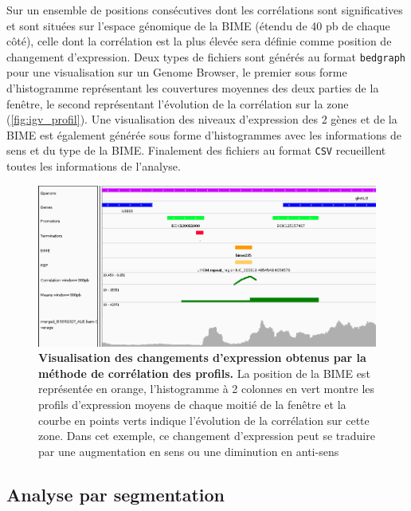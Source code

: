 \documentclass[12pt,a4paper]{report}
\begin{document}
\begin{onehalfspace}
Sur un ensemble de positions consécutives dont les corrélations sont significatives et sont situées sur l'espace génomique de la BIME (étendu de 40 pb de chaque côté), celle dont la corrélation est la plus élevée sera définie comme position de changement d'expression. Deux types de fichiers sont générés au format \texttt{bedgraph} pour une visualisation sur un Genome Browser, le premier sous forme d'histogramme représentant les couvertures moyennes des deux parties de la fenêtre, le second représentant l'évolution de la corrélation sur la zone (\autoref{fig:igv_profil}). Une visualisation des niveaux d'expression des 2 gènes et de la BIME est également générée sous forme d'histogrammes avec les informations de sens et du type de la BIME. Finalement des fichiers au format \texttt{CSV} recueillent toutes les informations de l'analyse.

\begin{figure}[ht]
\centerline{\includegraphics[scale=0.246]{figures/igv_profil.png}}
\caption{\textbf{Visualisation des changements d'expression obtenus par la méthode de corrélation des profils.} La position de la BIME est représentée en orange, l'histogramme à 2 colonnes en vert montre les profils d'expression moyens de chaque moitié de la fenêtre et la courbe en points verts indique l'évolution de la corrélation sur cette zone. Dans cet exemple, ce changement d'expression peut se traduire par une augmentation en sens ou une diminution en anti-sens}
\label{fig:igv_profil} 
\end{figure}

\subsection*{Analyse par segmentation}












\end{onehalfspace}


\printglossary[type=\acronymtype ,title=Glossaire]

%

\end{document}

